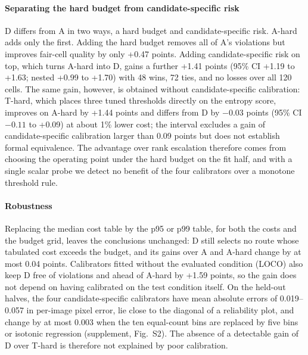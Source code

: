 \documentclass[a4paper,5p]{elsarticle}
\begin{document}
\paragraph{Separating the hard budget from candidate-specific risk} D differs from A in two ways, a hard budget and candidate-specific risk. A-hard adds only the first. Adding the hard budget removes all of A's violations but improves fair-cell quality by only +0.47 points. Adding candidate-specific risk on top, which turns A-hard into D, gains a further +1.41 points (95\% CI +1.19 to +1.63; nested +0.99 to +1.70) with 48 wins, 72 ties, and no losses over all 120 cells. The same gain, however, is obtained without candidate-specific calibration: T-hard, which places three tuned thresholds directly on the entropy score, improves on A-hard by +1.44 points and differs from D by $-0.03$ points (95\% CI $-0.11$ to +0.09) at about 1\% lower cost; the interval excludes a gain of candidate-specific calibration larger than 0.09 points but does not establish formal equivalence. The advantage over rank escalation therefore comes from choosing the operating point under the hard budget on the fit half, and with a single scalar probe we detect no benefit of the four calibrators over a monotone threshold rule.

\paragraph{Robustness} Replacing the median cost table by the p95 or p99 table, for both the costs and the budget grid, leaves the conclusions unchanged: D still selects no route whose tabulated cost exceeds the budget, and its gains over A and A-hard change by at most 0.04 points. Calibrators fitted without the evaluated condition (LOCO) also keep D free of violations and ahead of A-hard by +1.59 points, so the gain does not depend on having calibrated on the test condition itself. On the held-out halves, the four candidate-specific calibrators have mean absolute errors of 0.019--0.057 in per-image pixel error, lie close to the diagonal of a reliability plot, and change by at most 0.003 when the ten equal-count bins are replaced by five bins or isotonic regression (supplement, Fig.~S2). The absence of a detectable gain of D over T-hard is therefore not explained by poor calibration.
\end{document}
